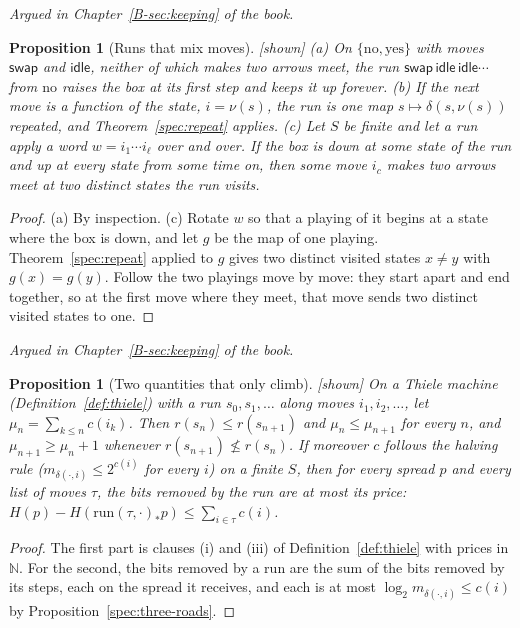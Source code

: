 \documentclass[11pt, a4paper]{article}
\theoremstyle{plain}
\newtheorem{proposition}[theorem]{Proposition}
\theoremstyle{definition}
\theoremstyle{remark}
\newcommand{\N}{\mathbb{N}}
\newcommand{\step}{\delta}
\newcommand{\cost}{c}
\newcommand{\rd}{r}
\newcommand{\run}{\mathrm{run}}
\newcommand{\argued}[1]{\par\noindent\textit{Argued in Chapter~\ref{B-#1} of the book.}\par}
\newcommand{\kind}[1]{\textup{[#1]}}
\begin{document}
\argued{sec:keeping}

\begin{proposition}[Runs that mix moves]\label{spec:mixed} \kind{shown}
(a) On $\{\mathrm{no},\mathrm{yes}\}$ with moves $\mathsf{swap}$ and $\mathsf{idle}$, neither of which makes two
arrows meet, the run $\mathsf{swap}\,\mathsf{idle}\,\mathsf{idle}\cdots$ from $\mathrm{no}$ raises the box at its
first step and keeps it up forever.
(b) If the next move is a function of the state, $i=\nu(s)$, the run is one map $s\mapsto\step(s,\nu(s))$
repeated, and Theorem~\ref{spec:repeat} applies.
(c) Let $S$ be finite and let a run apply a word $w=i_1\cdots i_\ell$ over and over. If the box is down at some
state of the run and up at every state from some time on, then some move $i_c$ makes two arrows meet at two
distinct states the run visits.
\end{proposition}

\begin{proof}
(a) By inspection. (c) Rotate $w$ so that a playing of it begins at a state where the box is down, and let $g$
be the map of one playing. Theorem~\ref{spec:repeat} applied to $g$ gives two distinct visited states $x\ne y$
with $g(x)=g(y)$. Follow the two playings move by move: they start apart and end together, so at the first
move where they meet, that move sends two distinct visited states to one.
\end{proof}

\argued{sec:keeping}

\begin{proposition}[Two quantities that only climb]\label{spec:two-climb} \kind{shown}
On a Thiele machine (Definition~\ref{def:thiele}) with a run $s_0,s_1,\dots$ along moves $i_1,i_2,\dots$, let
$\mu_n=\sum_{k\le n}\cost(i_k)$. Then $\rd(s_n)\le\rd(s_{n+1})$ and $\mu_n\le\mu_{n+1}$ for every $n$, and
$\mu_{n+1}\ge\mu_n+1$ whenever $\rd(s_{n+1})\not\le\rd(s_n)$. If moreover $\cost$ follows the halving rule
($m_{\step(\cdot,i)}\le2^{\cost(i)}$ for every $i$) on a finite $S$, then for every spread $p$ and every list
of moves $\tau$, the bits removed by the run are at most its price:
$H(p)-H(\run(\tau,\cdot)_*p)\le\sum_{i\in\tau}\cost(i)$.
\end{proposition}

\begin{proof}
The first part is clauses (i) and (iii) of Definition~\ref{def:thiele} with prices in $\N$. For the second,
the bits removed by a run are the sum of the bits removed by its steps, each on the spread it receives, and
each is at most $\log_2m_{\step(\cdot,i)}\le\cost(i)$ by Proposition~\ref{spec:three-roads}.
\end{proof}
\end{document}
